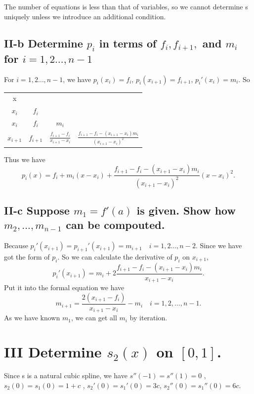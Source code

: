\documentclass[twoside,a4paper]{article}
\begin{document}
The number of equations is less than that of variables, so we cannot determine s uniquely unless we introduce an additional condition.

\subsection*{II-b \small{Determine $p_i$ in terms of  $f_i,f_{i+1},$ and $m_i$ for  $i=1,2\ldots,n-1$}}

For $i=1,2\ldots,n-1$, we have $p_i\left( x_i \right)=f_i$, $p_i\left( x_{i+1} \right)=f_{i+1} $, $p_{i}'\left( x_{i} \right)=m_{i} $.
So

\begin{tabular}{c|ccc}
x\\
$x_i$     &$f_i$\\
$x_i$     &$f_i$  &$m_i$\\
$x_{i+1}$ &$f_{i+1}$  &$\frac{f_{i+1}-f_i}{x_{i+1}-x_i}$  
	  &$\frac{f_{i+1}-f_i-\left( x_{i+1}-x_i \right)m_i }{\left( x_{i+1}-x_i \right)^2 }$\\
\end{tabular}

Thus we have 
$$p_i\left( x \right)=f_i+m_i\left( x-x_i \right)
+ \frac{f_{i+1}-f_i-\left( x_{i+1}-x_i \right)m_i }{\left( x_{i+1}-x_i \right)^2}\left( x-x_i \right)^2  .$$

\subsection*{II-c \small{Suppose $m_1=f'\left( a \right) $ is given. Show how $m_2,\ldots,m_{n-1}$ can be compouted.}}

Because $p_i'\left( x_{i+1}\right)=p_{i+1}'\left( x_{i+1} \right)=m_{i+1} \quad i=1,2\ldots,n-2 $.
Since we have got the form of $p_i$. 
So we can calculate the derivative of  $p_i$ on  $x_{i+1}$,
\[
	p_i'\left( x_{i+1} \right)=m_i+2\frac{f_{i+1}-f_i-\left( x_{i+1}-x_i \right)m_i }{x_{i+1}-x_i} 
.\] 
Put it into the formal equation we have
\[
	m_{i+1} =\frac{2\left( x_{i+1}-f_i \right) }{x_{i+1}-x_i}-m_i \quad i=1,2,\ldots,n-1
.\] 
As we have known $m_1$, we can get all  $m_i$ by iteration.

\section*{III \small{Determine $s_2\left( x \right)$ on $[0,1]$. }}

Since s is a natural cubic spline, we have $s''\left(  -1\right)=s''\left( 1 \right)=0 $ 
, $s_2\left(  0\right)=s_1\left( 0 \right)=1+c  $
, $s_2'\left( 0 \right)=s_1'\left( 0 \right)=3c$, $s_2''\left( 0 \right)=s_1''\left( 0 \right)=6c  $.  
\end{document}
